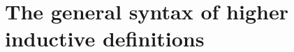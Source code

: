 \documentclass[hott-all.tex]{subfiles}
\begin{document}
\section{The general syntax of higher inductive definitions}
% 
% 
% 
% 
\end{document}
